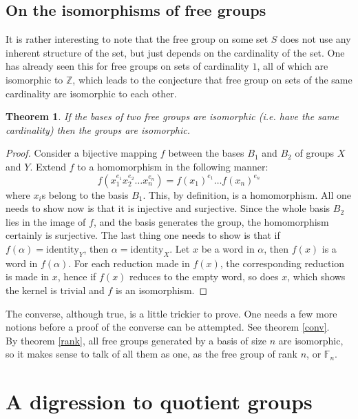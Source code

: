\documentclass[12pt, titlepage]{article}
\newtheorem{thm}{Theorem}[section]
\theoremstyle{definition}
\begin{document}
\subsection{On the isomorphisms of free groups\cite{lyndon}}

It is rather interesting to note that the free group on some set $S$ does not use any inherent structure of the set, but just depends on the cardinality of the set. One has already seen this for free groups on sets of cardinality $1$, all of which are isomorphic to $\mathbb{Z}$, which leads to the conjecture that free group on sets of the same cardinality are isomorphic to each other.

\begin{thm}\label{rank}
If the bases of two free groups are isomorphic (i.e. have the same cardinality) then the groups are isomorphic.
\end{thm}

\begin{proof}
Consider a bijective mapping $f$ between the bases $B_1$ and $B_2$ of groups $X$ and $Y$. Extend $f$ to a homomorphism in the following manner:
$$f(x_1^{e_1}x_2^{e_2} \ldots x_n^{e_n}) = f(x_1)^{e_1}\ldots f(x_n)^{e_n}$$
where $x_i$s belong to the basis $B_1$. This, by definition, is a homomorphism. All one needs to show now is that it is injective and surjective. Since the whole basis $B_2$ lies in the image of $f$,  and the basis generates the group, the homomorphism certainly is surjective. The last thing one needs to show is that if $f(\alpha)=\mathrm{identity}_{Y}$, then $\alpha=\mathrm{identity}_{X}$. Let $x$ be a word in $\alpha$, then $f(x)$ is a word in $f(\alpha)$. For each reduction made in $f(x)$, the corresponding reduction is made in $x$, hence if $f(x)$ reduces to the empty word, so does $x$, which shows the kernel is trivial and $f$ is an isomorphism.
\end{proof}


The converse, although true, is a little trickier to prove. One needs a few more notions before a proof of the converse can be attempted. See theorem \autoref{conv}.
\\
By theorem \autoref{rank}, all free groups generated by a basis of size $n$ are isomorphic, so it makes sense to talk of all them as one, as the free group of rank $n$, or $\mathbb{F}_n$.


\section{A digression to quotient groups}
\end{document}
